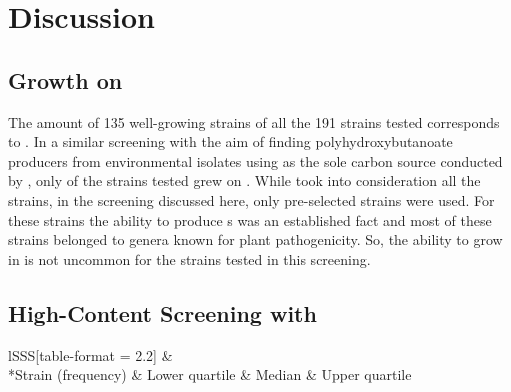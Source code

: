 \section{Discussion\label{sec-lch-eps-discussion}}
\subsection{Growth on \XYL{}\label{subsec-lch-eps-disc-xyl-hts}}
The amount of 135 well-growing strains of all the 191 strains tested corresponds to . In a similar screening with the aim of finding polyhydroxybutanoate producers from environmental isolates using \xyl{} as the sole carbon source conducted by \textcite{Lopes2009}, only  of the strains tested grew on \xyl{}. While \textcite{Lopes2009} took into consideration all the strains, in the screening discussed here, only pre-selected strains were used. For these strains the ability to produce \eps{}s was an established fact and most of these strains belonged to genera known for plant pathogenicity. So, the ability to grow in \xyl{} is not uncommon for the strains tested in this screening.

\subsection{High-Content Screening with \XYL{}\label{subsec-lch-eps-disc-xyl-hcs}}
\begin{table}
	\centering
	\setlength{\tabcolsep}{5pt}
	\caption[\XYL{} Consumption by Genus]{\XYL{} consumption by genus. The strains of the plate Xyl1 were incubated in SM17 P30S for  at  and . The initial \xyl{} concentration was . \XYL{} consumption varies among the strains in the range from \enquote{no consumption} to \enquote{complete consumption}. In this table, the consumption is summarized by genus to show that the bacterial genus appears to have a high impact on the \xyl{} consumption. The parenthesized number after the genus name indicates the number of strains belonging to the respective genus on plate Xyl1.\label{tbl-lch-eps-disc-xyl-hcs-c-b-g}}
	\begin{tabular}{lSSS[table-format = 2.2]}
		\toprule
		 &  \\
		*{Strain (frequency)} & {Lower quartile} & {Median} & {Upper quartile} \\
		\hline
		\bottomrule
	\end{tabular}
\end{table}


